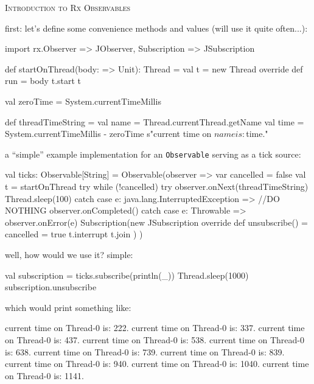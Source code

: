 \documentclass[8pt]{beamer}
\newcommand{\codeclass}[1]{\texttt{\textcolor[rgb]{0.4,0.85,0.9375}{#1}}}
\begin{document}
  \begin{center}
    \textsc{\huge{Introduction to Rx Observables}}
  \end{center}
  first: let's define some convenience methods and values (will use it quite often...):
  \begin{scalacode}
import rx.{Observer => JObserver, Subscription => JSubscription}  
  
def startOnThread(body: => Unit): Thread = {
  val t = new Thread {
    override def run = body
  }
  t.start
  t
}

val zeroTime = System.currentTimeMillis

def threadTimeString = {
  val name = Thread.currentThread.getName
  val time = System.currentTimeMillis - zeroTime
  s"current time on $name is: $time."
}
  \end{scalacode}
  \newpage
  
  a ``simple'' example implementation for an \codeclass{Observable} serving as a tick source:
  \begin{scalacode}
val ticks: Observable[String] = Observable(observer => {
  var cancelled = false
  val t = startOnThread {
    try {
      while (!cancelled) {
	try {
	  observer.onNext(threadTimeString)
	  Thread.sleep(100)
	} catch {
	  case e: java.lang.InterruptedException => //DO NOTHING
	}
      }
      observer.onCompleted()
    } catch {
      case e: Throwable => observer.onError(e)
    }
  }
  Subscription(new JSubscription {
    override def unsubscribe() = {
      cancelled = true
      t.interrupt
      t.join
    }
  })
})
  \end{scalacode}
  \newpage
  well, how would we use it? simple:
  \begin{scalacode}
val subscription = ticks.subscribe(println(_))
Thread.sleep(1000)
subscription.unsubscribe
  \end{scalacode}
  \medskip
  
  which would print something like:
  \begin{textcode}
current time on Thread-0 is: 222.
current time on Thread-0 is: 337.
current time on Thread-0 is: 437.
current time on Thread-0 is: 538.
current time on Thread-0 is: 638.
current time on Thread-0 is: 739.
current time on Thread-0 is: 839.
current time on Thread-0 is: 940.
current time on Thread-0 is: 1040.
current time on Thread-0 is: 1141.
  \end{textcode}
  \newpage
  
\end{document}

